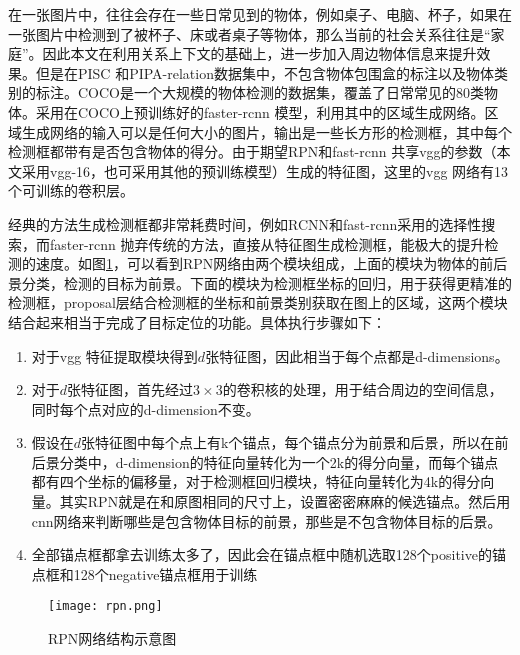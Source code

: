 在一张图片中，往往会存在一些日常见到的物体，例如桌子、电脑、杯子，如果在一张图片中检测到了被杯子、床或者桌子等物体，那么当前的社会关系往往是``家庭''。因此本文在利用关系上下文的基础上，进一步加入周边物体信息来提升效果。但是在PISC 和PIPA-relation数据集中，不包含物体包围盒的标注以及物体类别的标注。COCO\cite{lin2014microsoft}是一个大规模的物体检测的数据集，覆盖了日常常见的80类物体。采用在COCO上预训练好的faster-rcnn 模型，利用其中的区域生成网络。区域生成网络的输入可以是任何大小的图片，输出是一些长方形的检测框，其中每个检测框都带有是否包含物体的得分。由于期望RPN和fast-rcnn 共享vgg\cite{simonyan2015very}的参数（本文采用vgg-16，也可采用其他的预训练模型）生成的特征图，这里的vgg 网络有13个可训练的卷积层。

经典的方法生成检测框都非常耗费时间，例如RCNN和fast-rcnn采用的选择性搜索，而faster-rcnn 抛弃传统的方法，直接从特征图生成检测框，能极大的提升检测的速度。如图\ref{fig:rpn}，可以看到RPN网络由两个模块组成，上面的模块为物体的前后景分类，检测的目标为前景。下面的模块为检测框坐标的回归，用于获得更精准的检测框，proposal层结合检测框的坐标和前景类别获取在图上的区域，这两个模块结合起来相当于完成了目标定位的功能。具体执行步骤如下：
\begin{enumerate}
    \item 对于vgg 特征提取模块得到$d$张特征图，因此相当于每个点都是d-dimensions。
    \item 对于$d$张特征图，首先经过$3 \times 3$的卷积核的处理，用于结合周边的空间信息，同时每个点对应的d-dimension不变。
    \item 假设在$d$张特征图中每个点上有k个锚点，每个锚点分为前景和后景，所以在前后景分类中，d-dimension的特征向量转化为一个2k的得分向量，而每个锚点都有四个坐标的偏移量，对于检测框回归模块，特征向量转化为4k的得分向量。其实RPN就是在和原图相同的尺寸上，设置密密麻麻的候选锚点。然后用cnn网络来判断哪些是包含物体目标的前景，那些是不包含物体目标的后景。
    \item 全部锚点框都拿去训练太多了，因此会在锚点框中随机选取128个positive的锚点框和128个negative锚点框用于训练
\end{enumerate}
\begin{figure}[htpb]
	\centering
	\texttt{[image: rpn.png]}
    \caption{RPN网络结构示意图}
	\vspace*{-3.5mm}
	\label{fig:rpn}
\end{figure}
